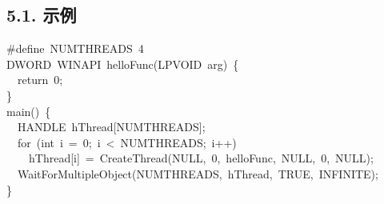 \documentclass{article}
\begin{document}
\subsection{5.1.\hspace*{0.5em} 示例}\label{sec-win32-api-}%
\begin{mdpre}%
\noindent\#define~{NUMTHREADS}~{4}\\
{DWORD}~{WINAPI}~helloFunc({LPVOID}~arg)~\{\\
~~{return}~{0};\\
\}\\
main()~\{\\
~~{HANDLE}~hThread[{NUMTHREADS}];\\
~~{for}~({int}~i~=~{0};~i~\textless{}~{NUMTHREADS};~i++)\\
~~~~hThread[i]~=~{CreateThread}({NULL},~{0},~helloFunc,~{NULL},~{0},~{NULL});\\
~~{WaitForMultipleObject}({NUMTHREADS},~hThread,~{TRUE},~{INFINITE});\\
\}%
\end{mdpre}
\end{document}
